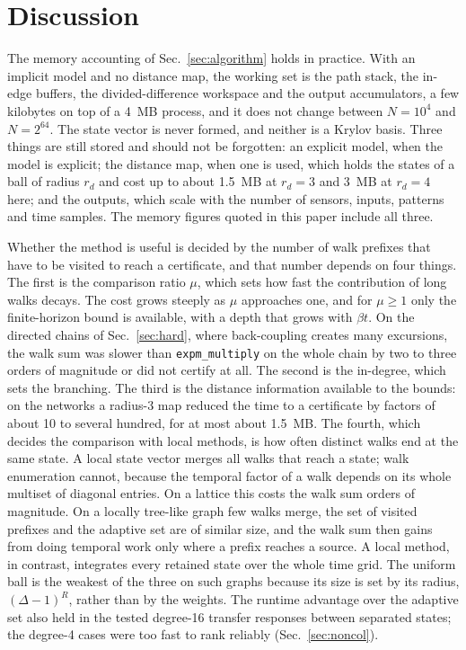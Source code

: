 \section{Discussion}\label{sec:discussion}

The memory accounting of Sec.~\ref{sec:algorithm} holds in practice. With an implicit model and no distance map, the working set is the path stack, the in-edge buffers, the divided-difference workspace and the output accumulators, a few kilobytes on top of a 4~MB process, and it does not change between $N=10^4$ and $N=2^{64}$. The state vector is never formed, and neither is a Krylov basis. Three things are still stored and should not be forgotten: an explicit model, when the model is explicit; the distance map, when one is used, which holds the states of a ball of radius $r_d$ and cost up to about 1.5~MB at $r_d=3$ and 3~MB at $r_d=4$ here; and the outputs, which scale with the number of sensors, inputs, patterns and time samples. The memory figures quoted in this paper include all three.

Whether the method is useful is decided by the number of walk prefixes that have to be visited to reach a certificate, and that number depends on four things. The first is the comparison ratio $\mu$, which sets how fast the contribution of long walks decays. The cost grows steeply as $\mu$ approaches one, and for $\mu\ge1$ only the finite-horizon bound is available, with a depth that grows with $\beta t$. On the directed chains of Sec.~\ref{sec:hard}, where back-coupling creates many excursions, the walk sum was slower than \texttt{expm\_multiply} on the whole chain by two to three orders of magnitude or did not certify at all. The second is the in-degree, which sets the branching. The third is the distance information available to the bounds: on the networks a radius-3 map reduced the time to a certificate by factors of about 10 to several hundred, for at most about 1.5~MB. The fourth, which decides the comparison with local methods, is how often distinct walks end at the same state. A local state vector merges all walks that reach a state; walk enumeration cannot, because the temporal factor of a walk depends on its whole multiset of diagonal entries. On a lattice this costs the walk sum orders of magnitude. On a locally tree-like graph few walks merge, the set of visited prefixes and the adaptive set are of similar size, and the walk sum then gains from doing temporal work only where a prefix reaches a source. A local method, in contrast, integrates every retained state over the whole time grid. The uniform ball is the weakest of the three on such graphs because its size is set by its radius, $(\Delta-1)^R$, rather than by the weights. The runtime advantage over the adaptive set also held in the tested degree-16 transfer responses between separated states; the degree-4 cases were too fast to rank reliably (Sec.~\ref{sec:noncol}).

